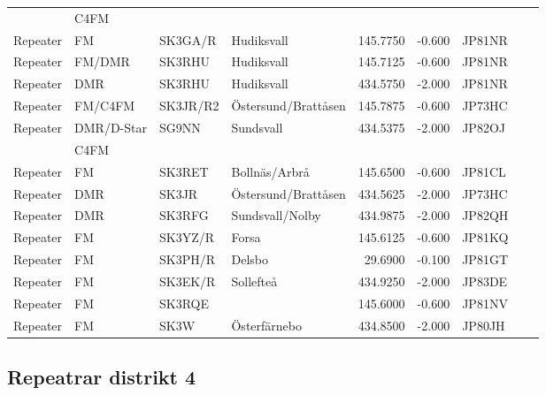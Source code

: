 \begin{longtable}{llllrrlcl}
	         & C4FM       &          &                        &            &          &        &  &  \\
	Repeater & FM         & SK3GA/R  & Hudiksvall             &   145.7750 &   -0.600 & JP81NR &  &  \\
	Repeater & FM/DMR     & SK3RHU   & Hudiksvall             &   145.7125 &   -0.600 & JP81NR &  &  \\
	Repeater & DMR        & SK3RHU   & Hudiksvall             &   434.5750 &   -2.000 & JP81NR &  &  \\
	Repeater & FM/C4FM    & SK3JR/R2 & Östersund/Brattåsen    &   145.7875 &   -0.600 & JP73HC &  &  \\
	Repeater & DMR/D-Star & SG9NN    & Sundsvall              &   434.5375 &   -2.000 & JP82OJ &  &  \\
	         & C4FM       &          &                        &            &          &        &  &  \\
	Repeater & FM         & SK3RET   & Bollnäs/Arbrå          &   145.6500 &   -0.600 & JP81CL &  &  \\
	Repeater & DMR        & SK3JR    & Östersund/Brattåsen    &   434.5625 &   -2.000 & JP73HC &  &  \\
	Repeater & DMR        & SK3RFG   & Sundsvall/Nolby        &   434.9875 &   -2.000 & JP82QH &  &  \\
	Repeater & FM         & SK3YZ/R  & Forsa                  &   145.6125 &   -0.600 & JP81KQ &  &  \\
	Repeater & FM         & SK3PH/R  & Delsbo                 &    29.6900 &   -0.100 & JP81GT &  &  \\
	Repeater & FM         & SK3EK/R  & Sollefteå              &   434.9250 &   -2.000 & JP83DE &  &  \\
	Repeater & FM         & SK3RQE   &                        &   145.6000 &   -0.600 & JP81NV &  &  \\
	Repeater & FM         & SK3W     & Österfärnebo           &   434.8500 &   -2.000 & JP80JH &  &
\end{longtable}

\subsection{Repeatrar distrikt 4}

